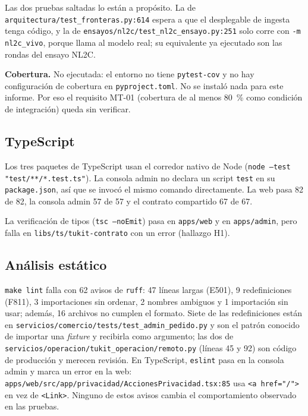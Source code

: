 \documentclass[11pt,letterpaper]{article}
\newcommand{\ruta}[1]{\texttt{\small #1}}
\begin{document}
Las dos pruebas saltadas lo están a propósito. La de \ruta{arquitectura/\allowbreak{}test\_\allowbreak{}fronteras.py:614} espera a que el
desplegable de ingesta tenga código, y la de \ruta{ensayos/\allowbreak{}nl2c/\allowbreak{}test\_\allowbreak{}nl2c\_\allowbreak{}ensayo.py:251} solo corre con
\ruta{-m nl2c\_\allowbreak{}vivo}, porque llama al modelo real; su equivalente ya ejecutado son las rondas del ensayo NL2C.

\textbf{Cobertura.} No ejecutada: el entorno no tiene \ruta{pytest-cov} y no hay configuración de cobertura en
\ruta{pyproject.toml}. No se instaló nada para este informe. Por eso el requisito MT-01 (cobertura de al menos
80~\% como condición de integración) queda sin verificar.

\subsection{TypeScript}

Los tres paquetes de TypeScript usan el corredor nativo de Node (\ruta{node --test "test/\allowbreak{}**/\allowbreak{}*.test.ts"}).
La consola admin no declara un script \ruta{test} en su \ruta{package.json}, así que se invocó el mismo
comando directamente. La web pasa 82 de 82, la consola admin 57 de 57 y el contrato compartido 67 de 67.

La verificación de tipos (\ruta{tsc --noEmit}) pasa en \ruta{apps/\allowbreak{}web} y en \ruta{apps/\allowbreak{}admin}, pero falla en
\ruta{libs/\allowbreak{}ts/\allowbreak{}tukit-contrato} con un error (hallazgo H1).

\subsection{Análisis estático}

\ruta{make lint} falla con 62 avisos de \ruta{ruff}: 47 líneas largas (E501), 9 redefiniciones (F811), 3
importaciones sin ordenar, 2 nombres ambiguos y 1 importación sin usar; además, 16 archivos no cumplen el
formato. Siete de las redefiniciones están en \ruta{servicios/\allowbreak{}comercio/\allowbreak{}tests/\allowbreak{}test\_\allowbreak{}admin\_\allowbreak{}pedido.py} y son el
patrón conocido de importar una \emph{fixture} y recibirla como argumento; las dos de
\ruta{servicios/\allowbreak{}operacion/\allowbreak{}tukit\_\allowbreak{}operacion/\allowbreak{}remoto.py} (líneas 45 y 92) son código de producción y merecen
revisión. En TypeScript, \ruta{eslint} pasa en la consola admin y marca un error en la web:
\ruta{apps/\allowbreak{}web/\allowbreak{}src/\allowbreak{}app/\allowbreak{}privacidad/\allowbreak{}AccionesPrivacidad.tsx:85} usa \ruta{<a href="/\allowbreak{}">} en vez de \ruta{<Link>}.
Ninguno de estos avisos cambia el comportamiento observado en las pruebas.
\end{document}
